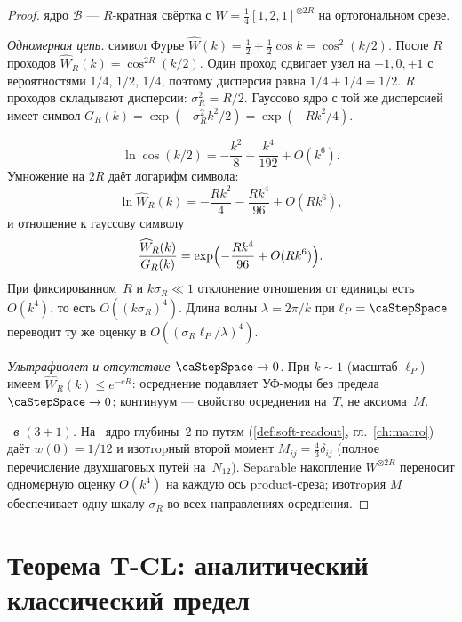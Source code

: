 \begin{proof}
ядро $\mathcal{B}$ --- $R$-кратная свёртка с $W=\tfrac14[1,2,1]^{\otimes 2R}$ на ортогональном срезе.

\smallskip
\emph{Одномерная цепь.}
символ Фурье
$\widehat W(k)=\tfrac12+\tfrac12\cos k=\cos^2(k/2)$.
После $R$ проходов $\widehat W_R(k)=\cos^{2R}(k/2)$.
Один проход сдвигает узел на $-1,0,+1$ с вероятностями $1/4$, $1/2$, $1/4$,
поэтому дисперсия равна $1/4+1/4=1/2$.
$R$ проходов складывают дисперсии: $\sigma_R^2=R/2$.
Гауссово ядро с той же дисперсией имеет символ $G_R(k)=\exp(-\sigma_R^2 k^2/2)=\exp(-Rk^2/4)$.

\[
  \ln\cos(k/2)=-\frac{k^2}{8}-\frac{k^4}{192}+O(k^6).
\]
Умножение на $2R$ даёт логарифм символа:
\[
  \ln\widehat W_R(k)=-\frac{Rk^2}{4}-\frac{Rk^4}{96}+O(Rk^6),
\]
и отношение к гауссову символу
\[
  \frac{\widehat W_R(k)}{G_R(k)}=\exp\Bigl(-\frac{Rk^4}{96}+O(Rk^6)\Bigr).
\]
При фиксированном~$R$ и $k\sigma_R\ll 1$ отклонение отношения от единицы есть $O(k^4)$,
то есть $O((k\sigma_R)^4)$.
Длина волны $\lambda=2\pi/k$ при $\ell_P=\caStepSpace$ переводит ту же оценку в $O((\sigma_R\ell_P/\lambda)^4)$.

\smallskip
\emph{Ультрафиолет и отсутствие $\caStepSpace\to 0$.}
При $k\sim 1$ (масштаб $\ell_P$) имеем $\widehat W_R(k)\le e^{-cR}$: осреднение подавляет
УФ-моды без предела $\caStepSpace\to 0$; континуум --- свойство осреднения на~$T$, не аксиома~$M$.

\smallskip
\emph{\latGCKshort\ в $(3{+}1)$.}
На \latGCK\ ядро глубины~$2$ по путям (\cref{def:soft-readout}, гл.~\ref{ch:macro})
даёт $w(0)=1/12$ и изотropный второй момент $M_{ij}=\tfrac43\delta_{ij}$
(полное перечисление двухшаговых путей на~$N_{12}$).
Separable накопление $W^{\otimes 2R}$ переносит одномерную оценку $O(k^4)$
на каждую ось product-среза; изотropия $M$ обеспечивает одну шкалу $\sigma_R$ во всех
направлениях осреднения.
\end{proof}

\section{Теорема T-CL: аналитический классический предел}
\label{sec:t-cl}

